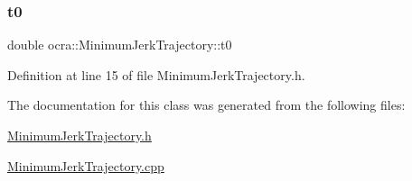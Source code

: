 \subsubsection{\texorpdfstring{t0}{t0}}
{\footnotesize\ttfamily double ocra\+::\+Minimum\+Jerk\+Trajectory\+::t0\hspace{0.3cm}{\ttfamily [protected]}}



Definition at line 15 of file Minimum\+Jerk\+Trajectory.\+h.



The documentation for this class was generated from the following files\+:\begin{DoxyCompactItemize}
\item 
\hyperlink{MinimumJerkTrajectory_8h}{Minimum\+Jerk\+Trajectory.\+h}\item 
\hyperlink{MinimumJerkTrajectory_8cpp}{Minimum\+Jerk\+Trajectory.\+cpp}\end{DoxyCompactItemize}
